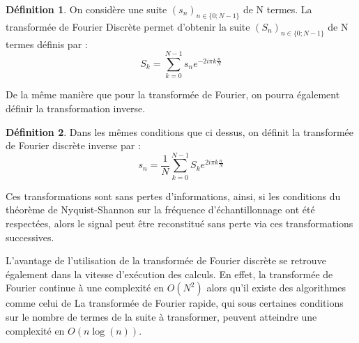 \documentclass[]{article}
\theoremstyle{remark}
\theoremstyle{definition}
\newtheorem{mydef}{Définition}
\begin{document}
	\begin{mydef}
			On considère une suite $(s_n)_{n\in \{0; N -1 \}}$ de N termes. La transformée de Fourier Discrète permet d'obtenir la suite  $(S_n)_{n\in \{0; N -1 \}}$ de N termes définis par :
			$$ S_k = \sum_{k=0}^{N-1}s_n e^{-2i\pi k\frac{n}{N}} $$
	\end{mydef}
		De la même manière que pour la transformée de Fourier, on pourra également définir la transformation inverse.
		
	\begin{mydef}
		Dans les mêmes conditions que ci dessus, on définit la transformée de Fourier discrète inverse par :
			$$ s_n =\frac{1}{N} \sum_{k=0}^{N-1}S_k e^{2i\pi k\frac{n}{N}} $$
	\end{mydef}
	
	Ces transformations sont sans pertes d'informations, ainsi, si les conditions du théorème de Nyquist-Shannon sur la fréquence d'échantillonnage ont été respectées, alors le signal peut être reconstitué sans perte via ces transformations successives. 
	
	L'avantage de l'utilisation de la transformée de Fourier discrète se retrouve également dans la vitesse d'exécution des calculs. En effet, la transformée de Fourier continue à une complexité en $O(N^2)$ alors qu'il existe des algorithmes comme celui de La transformée de Fourier rapide, qui sous certaines conditions sur le nombre de termes de la suite à transformer, peuvent atteindre une complexité en $O(n\log(n))$.
\end{document}
